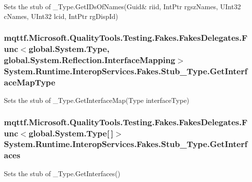 Sets the stub of \-\_\-\-Type.\-Get\-I\-Ds\-Of\-Names(Guid\& riid, Int\-Ptr rgsz\-Names, U\-Int32 c\-Names, U\-Int32 lcid, Int\-Ptr rg\-Disp\-Id)

\hypertarget{class_system_1_1_runtime_1_1_interop_services_1_1_fakes_1_1_stub___type_a5a55ea2447ffcd6f19fde1d08c8705e4}{
\subsubsection[{Get\-Interface\-Map\-Type}]{\setlength{\rightskip}{0pt plus 5cm}mqttf.\-Microsoft.\-Quality\-Tools.\-Testing.\-Fakes.\-Fakes\-Delegates.\-Func$<$global.\-System.\-Type, global.\-System.\-Reflection.\-Interface\-Mapping$>$ System.\-Runtime.\-Interop\-Services.\-Fakes.\-Stub\-\_\-\-Type.\-Get\-Interface\-Map\-Type}}\label{class_system_1_1_runtime_1_1_interop_services_1_1_fakes_1_1_stub___type_a5a55ea2447ffcd6f19fde1d08c8705e4}


Sets the stub of \-\_\-\-Type.\-Get\-Interface\-Map(\-Type interface\-Type)

\hypertarget{class_system_1_1_runtime_1_1_interop_services_1_1_fakes_1_1_stub___type_a35afaa945439b85833a19fbd2c0b2f8d}{
\subsubsection[{Get\-Interfaces}]{\setlength{\rightskip}{0pt plus 5cm}mqttf.\-Microsoft.\-Quality\-Tools.\-Testing.\-Fakes.\-Fakes\-Delegates.\-Func$<$global.\-System.\-Type\mbox{[}$\,$\mbox{]}$>$ System.\-Runtime.\-Interop\-Services.\-Fakes.\-Stub\-\_\-\-Type.\-Get\-Interfaces}}\label{class_system_1_1_runtime_1_1_interop_services_1_1_fakes_1_1_stub___type_a35afaa945439b85833a19fbd2c0b2f8d}


Sets the stub of \-\_\-\-Type.\-Get\-Interfaces()

